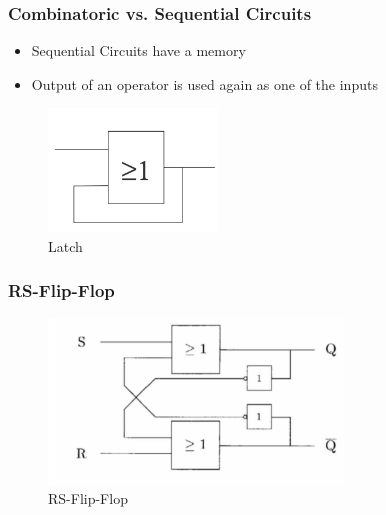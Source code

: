 \documentclass{beamer}
\begin{document}
\begin{frame}\frametitle{Combinatoric vs. Sequential Circuits}
\begin{itemize}
 \item Sequential Circuits have a memory
 \item Output of an operator is used again as one of the inputs
\end{itemize}


\begin{figure}[H]
\centering
  \includegraphics[width=0.4\textwidth]{loop}%
  \caption{Latch}%
  \label{fig:loop}
\end{figure}
\end{frame}

\begin{frame}\frametitle{RS-Flip-Flop}
\begin{figure}[H]
\centering
  \includegraphics[width=0.7\textwidth]{RSFF}%
  \caption{RS-Flip-Flop}%
  \label{fig:RSFF}
\end{figure}
\end{frame}
\end{document}
